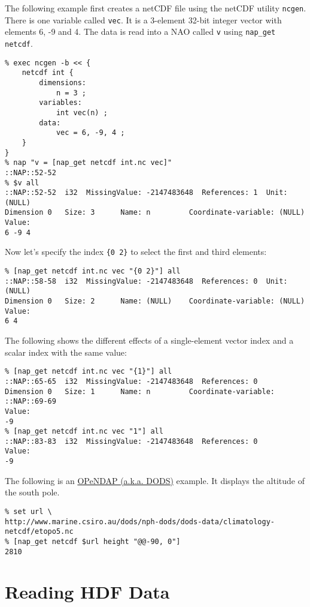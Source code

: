 The following example first creates a netCDF file using the netCDF
  utility 
  \texttt{ncgen}. There is one variable called 
  \texttt{vec}. It is a 3-element 32-bit integer vector with
  elements 6, -9 and 4. The data is read into a NAO called 
  \texttt{v} using 
  \texttt{nap\_get netcdf}.
  \begin{verbatim}
% exec ncgen -b << {
    netcdf int {
        dimensions:
            n = 3 ;
        variables:
            int vec(n) ;
        data:
            vec = 6, -9, 4 ;
    }
}
% nap "v = [nap_get netcdf int.nc vec]"
::NAP::52-52
% $v all
::NAP::52-52  i32  MissingValue: -2147483648  References: 1  Unit: (NULL)
Dimension 0   Size: 3      Name: n         Coordinate-variable: (NULL)
Value:
6 -9 4
\end{verbatim}

  

Now let's specify the index 
  \texttt{\{0 2\}} to select the first and third elements:
  \begin{verbatim}
% [nap_get netcdf int.nc vec "{0 2}"] all
::NAP::58-58  i32  MissingValue: -2147483648  References: 0  Unit: (NULL)
Dimension 0   Size: 2      Name: (NULL)    Coordinate-variable: (NULL)
Value:
6 4
\end{verbatim}

  

The following shows the different effects of a single-element
  vector index and a scalar index with the same value:
  \begin{verbatim}
% [nap_get netcdf int.nc vec "{1}"] all
::NAP::65-65  i32  MissingValue: -2147483648  References: 0
Dimension 0   Size: 1      Name: n         Coordinate-variable: ::NAP::69-69
Value:
-9
% [nap_get netcdf int.nc vec "1"] all
::NAP::83-83  i32  MissingValue: -2147483648  References: 0
Value:
-9
\end{verbatim}

The following is an 
  \href{http://www.opendap.org/}{OPeNDAP (a.k.a. DODS)} example.
  It displays the altitude of the south pole.
  \begin{verbatim}
% set url \
http://www.marine.csiro.au/dods/nph-dods/dods-data/climatology-netcdf/etopo5.nc
% [nap_get netcdf $url height "@@-90, 0"]
2810
\end{verbatim}

\section{Reading HDF Data}
    \label{nap-get-Reading-HDF-Data}

